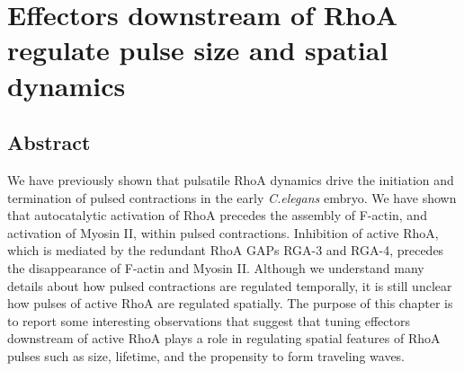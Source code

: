 \documentclass{ucetd}
\begin{document}
\chapter{Effectors downstream of RhoA regulate pulse size and spatial dynamics}

\section{Abstract}
We have previously shown that pulsatile RhoA dynamics drive the initiation and termination of pulsed contractions in the early \textit{C.elegans} embryo.  We have shown that autocatalytic activation of RhoA precedes the assembly of F-actin, and activation of Myosin II, within pulsed contractions.  Inhibition of active RhoA, which is mediated by the redundant RhoA GAPs RGA-3 and RGA-4, precedes the disappearance of F-actin and Myosin II.  Although we understand many details about how pulsed contractions are regulated temporally, it is still unclear how pulses of active RhoA are regulated spatially.  The purpose of this chapter is to report some interesting observations that suggest that tuning effectors downstream of active RhoA plays a role in regulating spatial features of RhoA pulses such as size, lifetime, and the propensity to form traveling waves.
\end{document}
